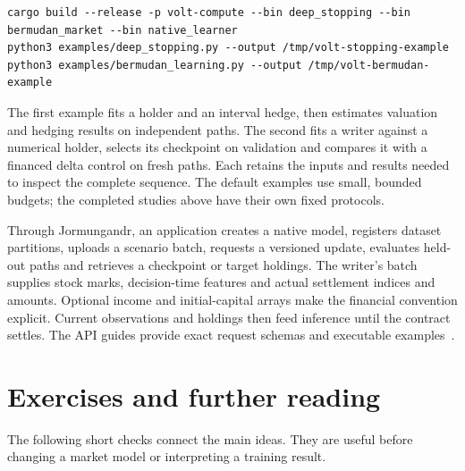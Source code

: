 \documentclass[8pt]{strategynet-journal}
\begin{document}
\noindent\begin{minipage}{\textwidth}
\begin{lstlisting}[basicstyle=\ttfamily\normalsize,frame=single,breaklines=true]
cargo build --release -p volt-compute --bin deep_stopping --bin bermudan_market --bin native_learner
python3 examples/deep_stopping.py --output /tmp/volt-stopping-example
python3 examples/bermudan_learning.py --output /tmp/volt-bermudan-example
\end{lstlisting}
\end{minipage}
\begin{SNcolumns}
The first example fits a holder and an interval hedge, then estimates valuation
and hedging results on independent paths. The second fits a writer against a
numerical holder, selects its checkpoint on validation and compares it with
a financed delta control on fresh paths. Each retains the inputs and results
needed to inspect the complete sequence. The default examples use small,
bounded budgets; the completed studies above have their own fixed protocols.

Through Jormungandr, an application creates a native model, registers dataset
partitions, uploads a scenario batch, requests a versioned update, evaluates
held-out paths and retrieves a checkpoint or target holdings. The writer's
batch supplies stock marks, decision-time features and actual settlement
indices and amounts. Optional income and initial-capital arrays make the
financial convention explicit. Current observations and holdings then feed
inference until the contract settles. The API guides provide exact request
schemas and executable examples~\cite{voltapi,jormapi}.

\section{Exercises and further reading}
The following short checks connect the main ideas. They are useful before
changing a market model or interpreting a training result.


\end{SNcolumns}
\end{document}
